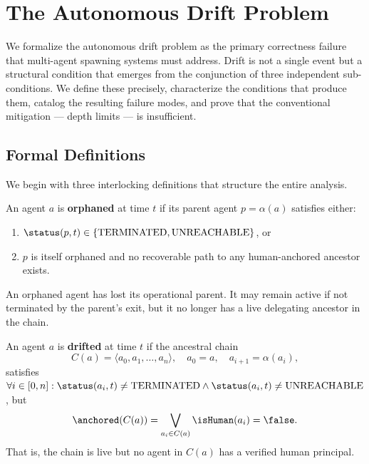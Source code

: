 \section{The Autonomous Drift Problem}
\label{sec:autonomous-drift}

We formalize the autonomous drift problem as the primary correctness failure that multi-agent spawning systems must address. Drift is not a single event but a structural condition that emerges from the conjunction of three independent sub-conditions. We define these precisely, characterize the conditions that produce them, catalog the resulting failure modes, and prove that the conventional mitigation — depth limits — is insufficient.

\subsection{Formal Definitions}

We begin with three interlocking definitions that structure the entire analysis.

\begin{definition}
\label{def:orphaned}
An agent $a$ is \textbf{orphaned} at time $t$ if its parent agent $p = \alpha(a)$ satisfies either:
\begin{enumerate}
    \item $\status(p, t) \in \{\text{TERMINATED}, \text{UNREACHABLE}\}$, or
    \item $p$ is itself orphaned and no recoverable path to any human-anchored ancestor exists.
\end{enumerate}
\end{definition}

An orphaned agent has lost its operational parent. It may remain active if not terminated by the parent's exit, but it no longer has a live delegating ancestor in the chain.

\begin{definition}
\label{def:drifted}
An agent $a$ is \textbf{drifted} at time $t$ if the ancestral chain
\begin{equation}
C(a) = \langle a_0, a_1, \ldots, a_n \rangle,
\quad a_0 = a,\quad a_{i+1} = \alpha(a_i),
\end{equation}
satisfies $\forall i \in [0,n]: \status(a_i, t) \neq \text{TERMINATED} \land \status(a_i, t) \neq \text{UNREACHABLE}$, but
\begin{equation}
\anchored(C(a)) = \bigvee_{a_i \in C(a)} \isHuman(a_i) = \false.
\end{equation}
That is, the chain is live but no agent in $C(a)$ has a verified human principal.
\end{definition}

